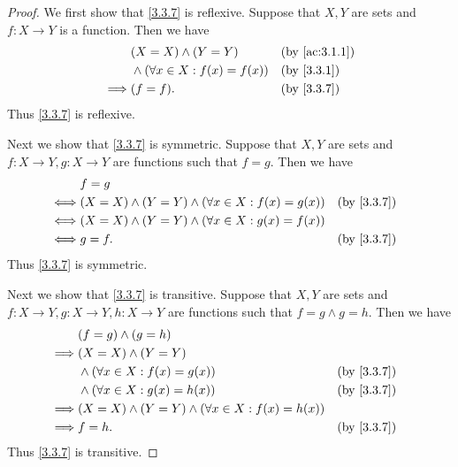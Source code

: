 \begin{proof}
  We first show that \cref{3.3.7} is reflexive.
  Suppose that \(X, Y\) are sets and \(f : X \to Y\) is a function.
  Then we have
  \begin{align*}
             & (X = X) \land (Y = Y)                 &  & \text{(by \cref{ac:3.1.1})} \\
             & \land (\forall x \in X : f(x) = f(x)) &  & \text{(by \cref{3.3.1})}    \\
    \implies & (f = f).                              &  & \text{(by \cref{3.3.7})}
  \end{align*}
  Thus \cref{3.3.7} is reflexive.

  Next we show that \cref{3.3.7} is symmetric.
  Suppose that \(X, Y\) are sets and \(f : X \to Y, g : X \to Y\) are functions such that \(f = g\).
  Then we have
  \begin{align*}
         & f = g                                                                                     \\
    \iff & (X = X) \land (Y = Y) \land (\forall x \in X : f(x) = g(x)) &  & \text{(by \cref{3.3.7})} \\
    \iff & (X = X) \land (Y = Y) \land (\forall x \in X : g(x) = f(x))                               \\
    \iff & g = f.                                                      &  & \text{(by \cref{3.3.7})}
  \end{align*}
  Thus \cref{3.3.7} is symmetric.

  Next we show that \cref{3.3.7} is transitive.
  Suppose that \(X, Y\) are sets and \(f : X \to Y, g : X \to Y, h : X \to Y\) are functions such that \(f = g \land g = h\).
  Then we have
  \begin{align*}
             & (f = g) \land (g = h)                                                                     \\
    \implies & (X = X) \land (Y = Y)                                                                     \\
             & \land (\forall x \in X : f(x) = g(x))                       &  & \text{(by \cref{3.3.7})} \\
             & \land (\forall x \in X : g(x) = h(x))                       &  & \text{(by \cref{3.3.7})} \\
    \implies & (X = X) \land (Y = Y) \land (\forall x \in X : f(x) = h(x))                               \\
    \implies & f = h.                                                      &  & \text{(by \cref{3.3.7})}
  \end{align*}
  Thus \cref{3.3.7} is transitive.


\end{proof}
